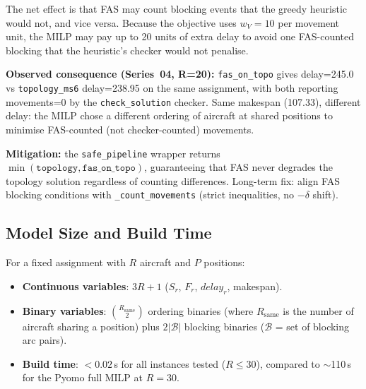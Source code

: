The net effect is that FAS may count blocking events that the greedy heuristic
would not, and vice versa.  Because the objective uses $w_V = 10$ per movement
unit, the MILP may pay up to 20 units of extra delay to avoid one FAS-counted
blocking that the heuristic's checker would not penalise.

\textbf{Observed consequence (Series~04, R=20):} \texttt{fas\_on\_topo} gives
delay=245.0 vs \texttt{topology\_ms6} delay=238.95 on the same assignment,
with both reporting movements=0 by the \texttt{check\_solution} checker.
Same makespan (107.33), different delay: the MILP chose a different ordering
of aircraft at shared positions to minimise FAS-counted (not checker-counted)
movements.

\textbf{Mitigation:} the \texttt{safe\_pipeline} wrapper returns
$\min(\texttt{topology}, \texttt{fas\_on\_topo})$, guaranteeing that FAS
never degrades the topology solution regardless of counting differences.
Long-term fix: align FAS blocking conditions with \texttt{\_count\_movements}
(strict inequalities, no $-\delta$ shift).

\subsection{Model Size and Build Time}

For a fixed assignment with $R$ aircraft and $P$ positions:
\begin{itemize}[noitemsep]
    \item \textbf{Continuous variables}: $3R + 1$ ($S_r$, $F_r$,
          $\mathit{delay}_r$, makespan).
    \item \textbf{Binary variables}: $\binom{R_{\mathrm{same}}}{2}$ ordering
          binaries (where $R_{\mathrm{same}}$ is the number of aircraft sharing
          a position) plus $2|\mathcal{B}|$ blocking binaries
          ($\mathcal{B}$ = set of blocking arc pairs).
    \item \textbf{Build time}: $<0.02$\,s for all instances tested
          ($R \leq 30$), compared to $\sim$110\,s for the Pyomo full MILP
          at $R=30$.
\end{itemize}
